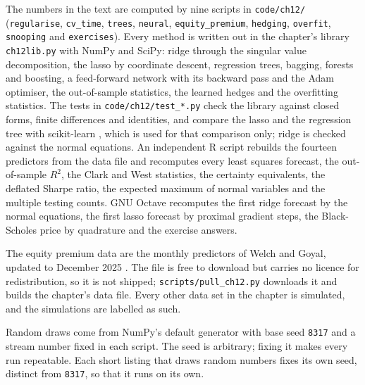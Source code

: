 \begin{chapterrefs}
\begin{keybox}
The numbers in the text are computed by nine scripts in \texttt{code/ch12/} (\texttt{regularise},
\texttt{cv\_time}, \texttt{trees}, \texttt{neural}, \texttt{equity\_premium}, \texttt{hedging},
\texttt{overfit}, \texttt{snooping} and \texttt{exercises}). Every method is written out in the chapter's library
\texttt{ch12lib.py} with NumPy and SciPy: ridge through the singular value decomposition, the lasso by
coordinate descent, regression trees, bagging, forests and boosting, a feed-forward network with its
backward pass and the Adam optimiser, the out-of-sample statistics, the learned hedges and the
overfitting statistics. The tests in \texttt{code/ch12/test\_*.py} check the library against closed
forms, finite differences and identities, and compare the lasso and the regression tree with
scikit-learn \parencite{sklearn2011}, which is used for that comparison only; ridge is checked against
the normal equations. An independent R script
rebuilds the fourteen predictors from the data file and recomputes every least squares forecast, the
out-of-sample $R^2$, the Clark and West statistics, the certainty equivalents, the deflated Sharpe ratio,
the expected maximum of normal variables and the multiple testing counts. GNU Octave recomputes the first
ridge forecast by the normal equations, the first lasso forecast by proximal gradient steps, the
Black-Scholes price by quadrature and the exercise answers.

The equity premium data are the monthly predictors of Welch and Goyal, updated to December 2025
\parencite{welch2008,goyalch12}. The file is free to download but carries no licence for
redistribution, so it is not shipped; \texttt{scripts/pull\_ch12.py} downloads it and builds the chapter's data file. Every
other data set in the chapter is simulated, and the simulations are labelled as such.

Random draws come from NumPy's default generator with base seed \texttt{8317} and a stream number fixed
in each script. The seed is arbitrary; fixing it makes every run repeatable. Each short listing that
draws random numbers fixes its own seed, distinct from \texttt{8317}, so that it runs on its own.


\end{keybox}
\end{chapterrefs}
